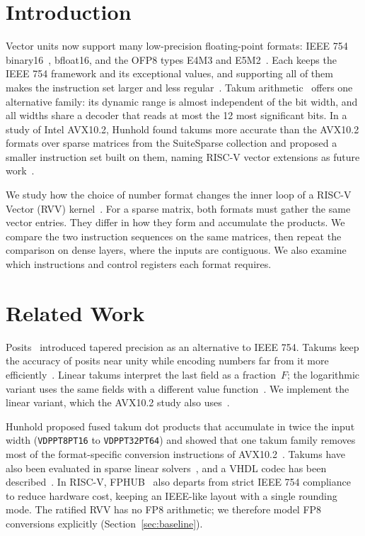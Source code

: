 \documentclass[conference]{IEEEtran}
\newcommand{\code}[1]{\texttt{#1}}
\begin{document}
\section{Introduction}
Vector units now support many low-precision floating-point formats: IEEE 754
binary16~\cite{ieee754}, bfloat16, and the OFP8 types E4M3 and
E5M2~\cite{ofp8}. Each keeps the IEEE 754 framework and its exceptional values,
and supporting all of them makes the instruction set larger and less
regular~\cite{simd}. Takum arithmetic~\cite{takum} offers one alternative
family: its dynamic range is almost independent of the bit width, and all widths
share a decoder that reads at most the 12 most significant bits. In a study of
Intel AVX10.2, Hunhold found takums more accurate than the AVX10.2 formats over
sparse matrices from the SuiteSparse collection and proposed a smaller
instruction set built on them, naming RISC-V vector extensions as future
work~\cite{simd}.

We study how the choice of number format changes the inner loop of a RISC-V
Vector (RVV) kernel~\cite{rvv}. For a sparse matrix, both formats must gather
the same vector entries. They differ in how they form and accumulate the
products. We compare the two instruction sequences on the same matrices, then
repeat the comparison on dense layers, where the inputs are contiguous. We
also examine which instructions and control registers each format requires.

\section{Related Work}
Posits~\cite{posit} introduced tapered precision as an alternative to IEEE 754.
Takums keep the accuracy of posits near unity while encoding numbers far from
it more efficiently~\cite{takum}. Linear takums interpret the last field as a
fraction~$F$; the logarithmic variant uses the same fields with a different
value function~\cite{takum}. We implement the linear variant, which the AVX10.2
study also uses~\cite{simd}.

Hunhold proposed fused takum dot products that accumulate in twice the input
width (\code{VDPPT8PT16} to \code{VDPPT32PT64}) and showed that one takum
family removes most of the format-specific conversion instructions of
AVX10.2~\cite{simd}. Takums have also been evaluated in sparse linear
solvers~\cite{sparsesolvers}, and a VHDL codec has been
described~\cite{takumvhdl}. In RISC-V, FPHUB~\cite{fphub} also departs from
strict IEEE 754 compliance to reduce hardware cost, keeping an IEEE-like layout
with a single rounding mode. The ratified RVV has no FP8 arithmetic; we
therefore model FP8 conversions explicitly (Section~\ref{sec:baseline}).
\end{document}
